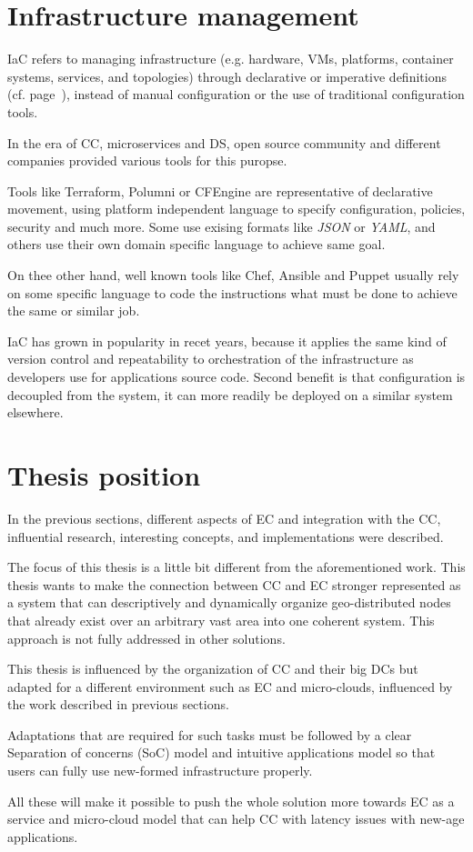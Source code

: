 \section{Infrastructure management}\label{sec:infrastructure_management}
%
IaC refers to managing infrastructure (e.g. hardware, VMs, platforms, container systems, services, and topologies) through declarative or imperative definitions (cf. page~\pageref{lab:dep_types}), instead of manual configuration or the use of traditional configuration tools.

In the era of CC, microservices and DS, open source community and different companies provided various tools for this puropse. 

Tools like Terraform, Polumni or CFEngine are representative of declarative movement, using platform independent language to specify configuration, policies, security and much more. Some use exising formats like \emph{JSON} or \emph{YAML}, and others use their own domain specific language to achieve same goal.

On thee other hand, well known tools like Chef, Ansible and Puppet usually rely on some specific language to code the instructions what must be done to achieve the same or similar job.

IaC has grown in popularity in recet years, because it applies the same kind of version control and repeatability to orchestration of the infrastructure as developers use for applications source code. Second benefit is that configuration is decoupled from the system, it can more readily be deployed on a similar system elsewhere.
%
%
\section{Thesis position}\label{sec:thesis_position}
%
In the previous sections, different aspects of EC and integration with the CC, influential research, interesting concepts, and implementations were described.

The focus of this thesis is a little bit different from the aforementioned work. This thesis wants to make the connection between CC and EC stronger represented as a system that can descriptively and dynamically organize geo-distributed nodes that already exist over an arbitrary vast area into one coherent system. This approach is not fully addressed in other solutions. 

This thesis is influenced by the organization of CC and their big DCs but adapted for a different environment such as EC and micro-clouds, influenced by the work described in previous sections. 

Adaptations that are required for such tasks must be followed by a clear Separation of concerns (SoC) model and intuitive applications model so that users can fully use new-formed infrastructure properly. 

All these will make it possible to push the whole solution more towards EC as a service and micro-cloud model that can help CC with latency issues with new-age applications.
%
%